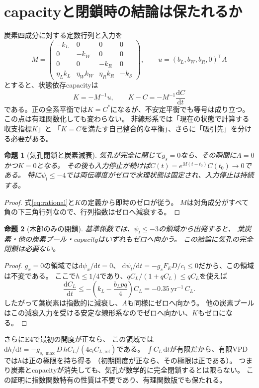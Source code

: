 \documentclass[a4paper,11pt]{ltjsarticle}
\newcommand{\dd}{\mathrm{d}}
\newcommand{\tr}{^{\mathsf T}}
\newtheorem{proposition}{命題}[section]
\begin{document}
\section{capacityと閉鎖時の結論は保たれるか}
炭素四成分に対する定数行列と入力を
\begin{equation}
 M=\begin{pmatrix}
 -k_L&0&0&0\\0&-k_W&0&0\\0&0&-k_R&0\\
 \eta_Lk_L&\eta_Wk_W&\eta_Rk_R&-k_S
 \end{pmatrix},\qquad
 u=(b_L,b_W,b_R,0)\tr A
\end{equation}
とすると、状態依存capacityは
\begin{equation}
 K=-M^{-1}u,\qquad K-C=-M^{-1}\frac{\dd C}{\dd t}
\end{equation}
である。正の全系平衡では$K=C^*$になるが、不安定平衡でも等号は成り立つ。
この点は有理関数化しても変わらない。
非線形系では「現在の状態で計算する収支指標$K$」と
「$K=C$を満たす自己整合的な平衡」、さらに「吸引先」を分ける必要がある。

\begin{proposition}[気孔閉鎖と炭素減衰]
気孔が完全に閉じて$g_s=0$なら、その瞬間に$A=0$かつ$K=0$となる。
その後も入力停止が続けば$C(t)=e^{M(t-t_0)}C(t_0)\to0$である。
特に$\psi_l\leq-4$では両伝導度がゼロで水理状態は固定され、入力停止は持続する。
\end{proposition}
\begin{proof}
式\eqref{eq:rational}と$K$の定義から即時のゼロが従う。
$M$は対角成分がすべて負の下三角行列なので、行列指数はゼロへ減衰する。
\end{proof}

\begin{proposition}[木部のみの閉鎖]
基準係数では、$\psi_l\leq-3$の領域から出発すると、
葉炭素・他の炭素プール・capacityはいずれもゼロへ向かう。
この結論に気孔の完全閉鎖は必要ない。
\end{proposition}
\begin{proof}
$g_x=0$の領域では$\dd\psi_x/\dd t=0$、
$\dd\psi_l/\dd t=-g_sF_ED/c_l\leq0$だから、この領域は不変である。
ここで$h\leq1/4$であり、$qC_L/(1+qC_L)\leq qC_L$を使えば
\begin{equation}
 \frac{\dd C_L}{\dd t}
 \leq-\left(k_L-\frac{b_Lpq}{4}\right)C_L
 =-0.35\,\mathrm{yr^{-1}}\,C_L .
\end{equation}
したがって葉炭素は指数的に減衰し、$A$も同様にゼロへ向かう。
他の炭素プールはこの減衰入力を受ける安定な線形系なのでゼロへ向かい、$K$もゼロになる。
\end{proof}
さらにE4で最初の開度が正なら、
この領域では$\dd h/\dd t=-g_{s,\max}D\,hC_L/(4c_lC_{L,\mathrm{ref}})$である。
$\int C_L\,\dd t$が有限だから、有限VPDでは$h$は正の極限を持ち得る
（初期開度が正なら、その極限は正である）。
つまり炭素とcapacityが消失しても、気孔が数学的に完全閉鎖するとは限らない。
この証明に指数関数特有の性質は不要であり、有理関数版でも保たれる。
\end{document}
